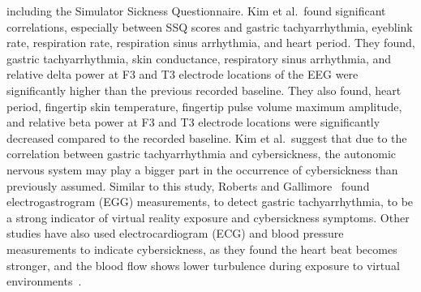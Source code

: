including the Simulator Sickness Questionnaire.
Kim et al.\ found significant correlations, especially between SSQ scores and gastric tachyarrhythmia, eyeblink rate,
respiration rate, respiration sinus arrhythmia, and heart period.
They found, gastric tachyarrhythmia, skin conductance, respiratory sinus arrhythmia, and relative delta power at F3
and T3 electrode locations of the EEG were significantly higher than the previous recorded baseline.
They also found, heart period, fingertip skin temperature, fingertip pulse volume maximum amplitude, and relative
beta power at F3 and T3 electrode locations were significantly decreased compared to the recorded baseline.
Kim et al.\ suggest that due to the correlation between gastric tachyarrhythmia and cybersickness, the autonomic
nervous system may play a bigger part in the occurrence of cybersickness than previously assumed.
Similar to this study, Roberts and Gallimore~\cite{Roberts2005} found electrogastrogram (EGG) measurements, to detect
gastric tachyarrhythmia, to be a strong indicator of virtual reality exposure and cybersickness symptoms.
Other studies have also used electrocardiogram (ECG) and blood pressure measurements to indicate cybersickness, as 
they found the heart beat becomes stronger, and the blood flow shows lower turbulence during exposure to virtual
environments~\cite{Kiryu2007, Watanabe2008}.

